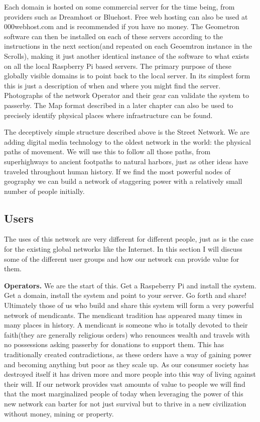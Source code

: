 Each domain is hosted on some commercial server for the time being, from
providers such as Dreamhost or Bluehost. Free web hosting can also be
used at 000webhost.com and is recommended if you have no money. The
Geometron software can then be installed on each of these servers
according to the instructions in the next section(and repeated on each
Geoemtron instance in the Scrolls), making it just another identical
instance of the software to what exists on all the local Raspberry Pi
based servers. The primary purpose of these globally visible domains is
to point back to the local server. In its simplest form this is just a
description of when and where you might find the server. Photographs of
the network Operator and their gear can validate the system to passerby.
The Map format described in a later chapter can also be used to
precisely identify physical places where infrastructure can be found.

The deceptively simple structure described above is the Street Network.
We are adding digital media technology to the oldest network in the
world: the physical paths of movement. We will use this to follow all
those paths, from superhighways to ancient footpaths to natural harbors,
just as other ideas have traveled throughout human history. If we find
the most powerful nodes of geography we can build a network of
staggering power with a relatively small number of people initially.

\hypertarget{users}{%
\subsection{Users}\label{users}}

The uses of this network are very different for different people, just
as is the case for the existing global networks like the Internet. In
this section I will discuss some of the different user groups and how
our network can provide value for them.

\textbf{Operators.} We are the start of this. Get a Raspeberry Pi and
install the system. Get a domain, install the system and point to your
server. Go forth and share! Ultimately those of us who build and share
this system will form a very powerful network of mendicants. The
mendicant tradition has appeared many times in many places in history. A
mendicant is someone who is totally devoted to their faith(they are
generally religious orders) who renounces wealth and travels with no
possessions asking passerby for donations to support them. This has
traditionally created contradictions, as these orders have a way of
gaining power and becoming anything but poor as they scale up. As our
consumer society has destroyed itself it has driven more and more people
into this way of living against their will. If our network provides vast
amounts of value to people we will find that the most marginalized
people of today when leveraging the power of this new network can barter
for not just survival but to thrive in a new civilization without money,
mining or property.

